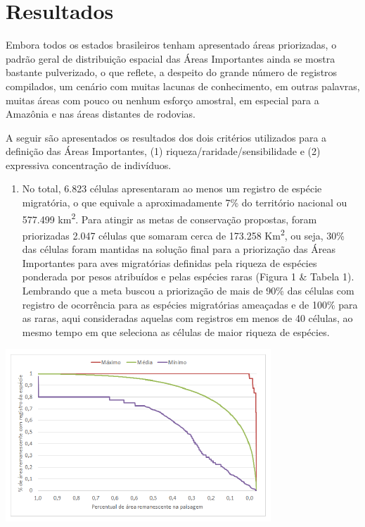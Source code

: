 \documentclass[
]{scrbook}
\providecommand{\tightlist}{%
  \setlength{\itemsep}{0pt}\setlength{\parskip}{0pt}}
\begin{document}
\hypertarget{resultados}{%
\section{Resultados}\label{resultados}}

Embora todos os estados brasileiros tenham apresentado áreas priorizadas, o padrão geral de distribuição espacial das Áreas Importantes ainda se mostra bastante pulverizado, o que reflete, a despeito do grande número de registros compilados, um cenário com muitas lacunas de conhecimento, em outras palavras, muitas áreas com pouco ou nenhum esforço amostral, em especial para a Amazônia e nas áreas distantes de rodovias.

A seguir são apresentados os resultados dos dois critérios utilizados para a definição das Áreas Importantes, (1) riqueza/raridade/sensibilidade e (2) expressiva concentração de indivíduos.

\begin{enumerate}
\def\labelenumi{(\arabic{enumi})}
\tightlist
\item
  No total, 6.823 células apresentaram ao menos um registro de espécie migratória, o que equivale a aproximadamente 7\% do território nacional ou 577.499 km\textsuperscript{2}. Para atingir as metas de conservação propostas, foram priorizadas 2.047 células que somaram cerca de 173.258 Km\textsuperscript{2}, ou seja, 30\% das células foram mantidas na solução final para a priorização das Áreas Importantes para aves migratórias definidas pela riqueza de espécies ponderada por pesos atribuídos e pelas espécies raras (Figura 1 \& Tabela 1). Lembrando que a meta buscou a priorização de mais de 90\% das células com registro de ocorrência para as espécies migratórias ameaçadas e de 100\% para as raras, aqui consideradas aquelas com registros em menos de 40 células, ao mesmo tempo em que seleciona as células de maior riqueza de espécies.
\end{enumerate}

\begin{center}\includegraphics[width=0.8\linewidth]{imagens/figura01} \end{center}
\end{document}
